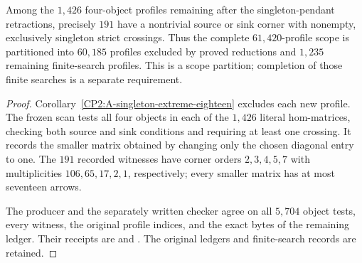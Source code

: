 \begin{proposition}
\label{CP2:A-four-eighteen-trivial-extreme-scope}
Among the $1,426$ four-object profiles remaining after the
singleton-pendant retractions, precisely $191$ have a nontrivial
source or sink corner with nonempty, exclusively singleton strict
crossings. Thus the complete $61,420$-profile scope is partitioned
into $60,185$ profiles excluded by proved reductions and $1,235$
remaining finite-search profiles. This is a scope partition;
completion of those finite searches is a separate requirement.
\end{proposition}
\begin{proof}
Corollary~\ref{CP2:A-singleton-extreme-eighteen} excludes each
new profile. The frozen scan tests all four objects in each of the
$1,426$ literal hom-matrices, checking both source and sink
conditions and requiring at least one crossing. It records the
smaller matrix obtained by changing only the chosen diagonal
entry to one. The $191$ recorded witnesses have corner orders
$2,3,4,5,7$ with multiplicities $106,65,17,2,1$, respectively;
every smaller matrix has at most seventeen arrows.

The producer
and the separately written checker
agree on all $5,704$ object tests, every witness, the original
profile indices, and the exact bytes of the remaining ledger.
Their receipts are
and
.
The original ledgers and finite-search records are retained.
\end{proof}
